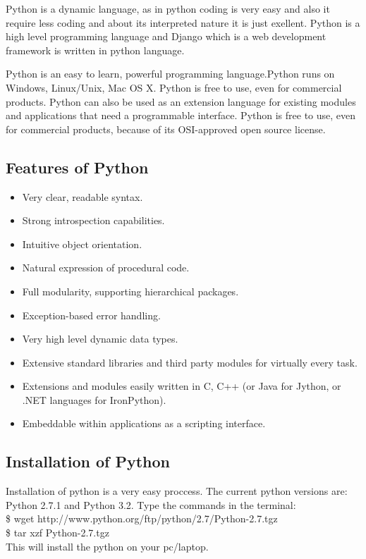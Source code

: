 \noindent Python is a dynamic language, as in python coding is very easy and 
also it require less coding and about its interpreted nature it is 
just exellent. Python is a high level programming language and Django 
which is a web development framework is written in python language.

Python is an easy to learn, powerful programming language.Python runs 
on Windows, Linux/Unix, Mac OS X. Python is free to use, even for 
commercial products. Python can also be used as an extension language 
for existing modules and applications that need a programmable interface.  
Python is free to use, even for commercial products, because of its 
OSI-approved open source license.
\subsection{Features of Python}
\begin{itemize}
\item Very clear, readable syntax.
\item Strong introspection capabilities.
\item Intuitive object orientation.
\item Natural expression of procedural code.
\item Full modularity, supporting hierarchical packages.
\item Exception-based error handling.
\item Very high level dynamic data types.
\item Extensive standard libraries and third party modules for virtually every task.
\item Extensions and modules easily written in C, C++ (or Java for Jython, or .NET languages for IronPython).
\item Embeddable within applications as a scripting interface.
\end{itemize}
\subsection{Installation of Python}
Installation of python is a very easy proccess.
The current python versions are: Python 2.7.1 and Python 3.2.
Type the commands in the terminal:\\

 \$ wget http://www.python.org/ftp/python/2.7/Python-2.7.tgz\\

 
 \$ tar xzf Python-2.7.tgz\\


This will install the python on your pc/laptop.

